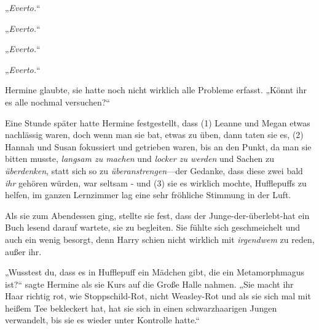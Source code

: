 „\emph{Everto.}“

„\emph{Everto.}“

„\emph{Everto.}“

„\emph{Everto.}“

Hermine glaubte, sie hatte noch nicht wirklich alle Probleme erfasst. „Könnt ihr es alle nochmal versuchen?“

Eine Stunde später hatte Hermine festgestellt, dass (1) Leanne und Megan etwas nachlässig waren, doch wenn man sie bat, etwas zu üben, dann taten sie es, (2) Hannah und Susan fokussiert und getrieben waren, bis an den Punkt, da man sie bitten musste, \emph{langsam zu machen} und \emph{locker zu werden} und Sachen zu \emph{überdenken}, statt sich so zu \emph{überanstrengen}—der Gedanke, dass diese zwei bald \emph{ihr} gehören würden, war seltsam - und (3) sie es wirklich mochte, Hufflepuffs zu helfen, im ganzen Lernzimmer lag eine sehr fröhliche Stimmung in der Luft.

Als sie zum Abendessen ging, stellte sie fest, dass der Junge-der-überlebt-hat ein Buch lesend darauf wartete, sie zu begleiten. Sie fühlte sich geschmeichelt und auch ein wenig besorgt, denn Harry schien nicht wirklich mit \emph{irgendwem} zu reden, außer ihr.

„Wusstest du, dass es in Hufflepuff ein Mädchen gibt, die ein Metamorphmagus ist?“ sagte Hermine als sie Kurs auf die Große Halle nahmen. „Sie macht ihr Haar richtig rot, wie Stoppschild-Rot, nicht Weasley-Rot und als sie sich mal mit heißem Tee bekleckert hat, hat sie sich in einen schwarzhaarigen Jungen verwandelt, bis sie es wieder unter Kontrolle hatte.“

